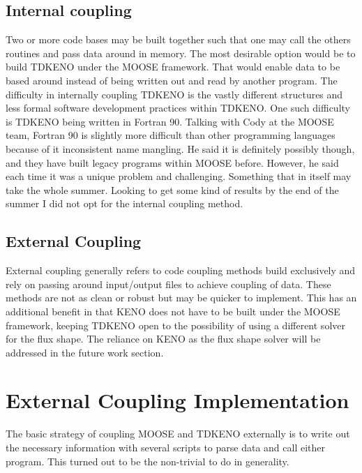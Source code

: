 \documentclass[11pt]{article}
\begin{document}
\subsection{Internal coupling}
 Two or more code bases may be built together such that one may call the others routines and pass data around in memory.  The most desirable option would be to build TDKENO under the MOOSE framework.  That would enable data to be based around instead of being written out and read by another program.  The difficulty in internally coupling TDKENO is the vastly different structures and less formal software development practices within TDKENO.  One such difficulty is TDKENO being written in Fortran 90.  Talking with Cody at the MOOSE team, Fortran 90 is slightly more difficult than other programming languages because of it inconsistent name mangling.  He said it is definitely possibly though, and they have built legacy programs within MOOSE before.  However, he said each time it was a unique problem and challenging.  Something that in itself may take the whole summer.  Looking to get some kind of results by the end of the summer I did not opt for the internal coupling method.

\subsection{External Coupling}
External coupling generally refers to code coupling methods build exclusively and rely on passing around input/output files to achieve coupling of data.  These methods are not as clean or robust but may be quicker to implement. This has an additional benefit in that KENO does not have to be built under the MOOSE framework, keeping TDKENO open to the possibility of using a different solver for the flux shape.  The reliance on KENO as the flux shape solver will be addressed in the future work section. 

\section{External Coupling Implementation}

The basic strategy of coupling MOOSE and TDKENO externally is to write out the necessary information with several scripts to parse data and call either program. This turned out to be the non-trivial to do in generality. 
\end{document}
